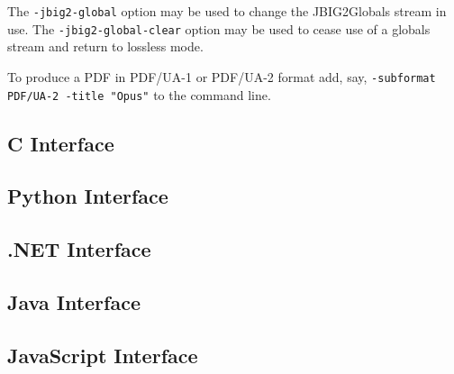 \documentclass{book}
\begin{document}
\noindent The \texttt{-jbig2-global} option may be used to change the JBIG2Globals stream in use. The \texttt{-jbig2-global-clear} option may be used to cease use of a globals stream and return to lossless mode.

To produce a PDF in PDF/UA-1 or PDF/UA-2 format add, say, \texttt{-subformat PDF/UA-2 -title "Opus"} to the command line.

\begin{cpdflib}
\clearpage
\section*{C Interface}
\begin{small}\tt

\end{small}
\end{cpdflib}

\begin{pycpdflib}
\clearpage
\section*{Python Interface}
\begin{small}\tt

\end{small}
\end{pycpdflib}

\begin{dotnetcpdflib}
\clearpage
\section*{.NET Interface}
\begin{small}\tt

\end{small}
\end{dotnetcpdflib}

\begin{jcpdflib}
\clearpage
\section*{Java Interface}
\begin{small}\tt

\end{small}
\end{jcpdflib}

\begin{jscpdflib}
\clearpage
\section*{JavaScript Interface}
\begin{small}\tt

\end{small}
\end{jscpdflib}
\end{document}
